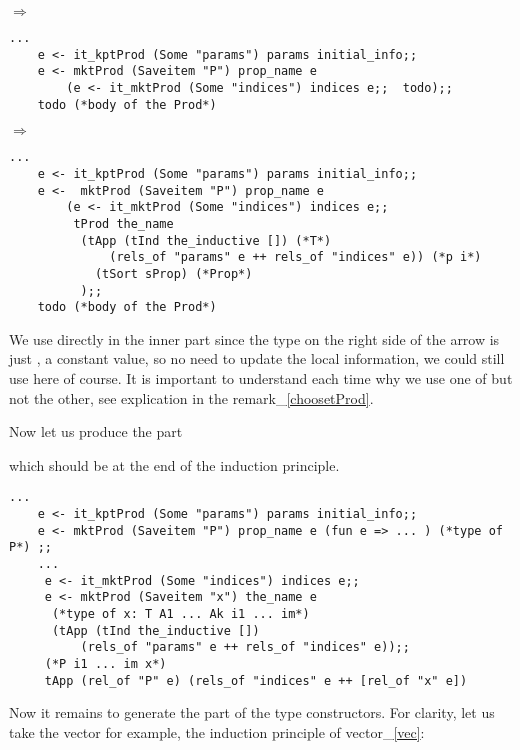 \documentclass[a4paper,UKenglish,cleveref, autoref, thm-restate]{lipics-v2021}
\begin{document}
$\Longrightarrow$
\begin{lstlisting}[language = {Coq}, basicstyle = \small]
    ...
    e <- it_kptProd (Some "params") params initial_info;;
    e <- mktProd (Saveitem "P") prop_name e 
        (e <- it_mktProd (Some "indices") indices e;;  todo);;
    todo (*body of the Prod*)
\end{lstlisting}

$\Longrightarrow$
\begin{lstlisting}[language = {Coq}, basicstyle = \small]
    ...
    e <- it_kptProd (Some "params") params initial_info;;
    e <-  mktProd (Saveitem "P") prop_name e
        (e <- it_mktProd (Some "indices") indices e;;
         tProd the_name
          (tApp (tInd the_inductive []) (*T*)
              (rels_of "params" e ++ rels_of "indices" e)) (*p i*)
            (tSort sProp) (*Prop*)
          );;
    todo (*body of the Prod*)
\end{lstlisting}

We use  directly in the inner part since the type on the right side of the arrow is just , a constant value, so no need to update the local information, we could still use  here of course. It is important to understand each time why we use one of  but not the other, see explication in the remark_\ref{choosetProd}.

Now let us produce the part 


which should be at the end of the induction principle.
\begin{lstlisting}[language = {Coq}, basicstyle = \small]
    ...
    e <- it_kptProd (Some "params") params initial_info;;
    e <- mktProd (Saveitem "P") prop_name e (fun e => ... ) (*type of P*) ;;
    ...
     e <- it_mktProd (Some "indices") indices e;;
     e <- mktProd (Saveitem "x") the_name e
      (*type of x: T A1 ... Ak i1 ... im*)
      (tApp (tInd the_inductive [])
          (rels_of "params" e ++ rels_of "indices" e));;
     (*P i1 ... im x*)
     tApp (rel_of "P" e) (rels_of "indices" e ++ [rel_of "x" e])
\end{lstlisting}

Now it remains to generate the part of the type constructors. For clarity, let us take the vector for example,
the induction principle of vector_\ref{vec}:
\end{document}
